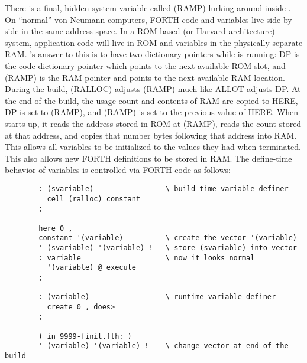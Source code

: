 \documentclass{article}
\begin{document}
There is a final, hidden system variable called (RAMP) lurking around
inside \M. On ``normal'' von Neumann computers, FORTH code and
variables live side by side in the same address space. In a ROM-based
(or Harvard architecture) system, application code will live in ROM
and variables in the physically separate RAM. \M's answer to this is
to have two dictionary pointers while  is running: DP is
the code dictionary pointer which points to the next available ROM
slot, and (RAMP) is the RAM pointer and points to the next available
RAM location. During the build, (RALLOC) adjusts (RAMP) much like
ALLOT adjusts DP. At the end of the build, the usage-count and
contents of RAM are copied to HERE, DP is set to (RAMP), and (RAMP) is
set to the previous value of HERE. When  starts up, it
reads the address stored in ROM at (RAMP), reads the count stored at
that address, and copies that number bytes following that address into
RAM. This allows all variables to be initialized to the values they
had when  terminated. This also allows new FORTH
definitions to be stored in RAM. The define-time behavior of variables
is controlled via FORTH code as follows:
\begin{verbatim}
        : (svariable)                 \ build time variable definer
          cell (ralloc) constant
        ;

        here 0 ,
        constant '(variable)          \ create the vector '(variable)
        ' (svariable) '(variable) !   \ store (svariable) into vector
        : variable                    \ now it looks normal
          '(variable) @ execute
        ;

        : (variable)                  \ runtime variable definer
          create 0 , does>
        ;

        ( in 9999-finit.fth: )
        ' (variable) '(variable) !    \ change vector at end of the build
\end{verbatim}
\end{document}
